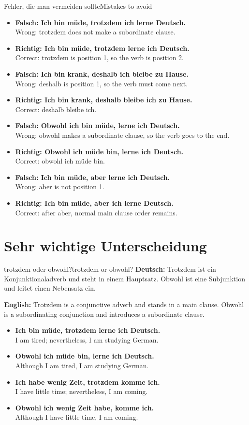 \documentclass[a4paper,11pt]{article}
\newcommand{\GermanText}[1]{\textbf{Deutsch: }#1\par}
\newcommand{\EnglishText}[1]{{\small\color{SoftGray}\textbf{English: }#1\par}}
\newcommand{\ExampleItem}[2]{\item \textbf{#1}\\{\small\color{SoftGray}#2}}
\begin{document}
        \begin{grammarentry}{Fehler, die man vermeiden sollte}{Mistakes to avoid}
            \begin{exbox}
                \begin{itemize}
                    \ExampleItem{Falsch: Ich bin müde, trotzdem ich lerne Deutsch.}{Wrong: trotzdem does not make a subordinate clause.}
                    \ExampleItem{Richtig: Ich bin müde, trotzdem lerne ich Deutsch.}{Correct: trotzdem is position 1, so the verb is position 2.}
                    
                    \ExampleItem{Falsch: Ich bin krank, deshalb ich bleibe zu Hause.}{Wrong: deshalb is position 1, so the verb must come next.}
                    \ExampleItem{Richtig: Ich bin krank, deshalb bleibe ich zu Hause.}{Correct: deshalb bleibe ich.}
                    
                    \ExampleItem{Falsch: Obwohl ich bin müde, lerne ich Deutsch.}{Wrong: obwohl makes a subordinate clause, so the verb goes to the end.}
                    \ExampleItem{Richtig: Obwohl ich müde bin, lerne ich Deutsch.}{Correct: obwohl ich müde bin.}
                    
                    \ExampleItem{Falsch: Ich bin müde, aber lerne ich Deutsch.}{Wrong: aber is not position 1.}
                    \ExampleItem{Richtig: Ich bin müde, aber ich lerne Deutsch.}{Correct: after aber, normal main clause order remains.}
                \end{itemize}
            \end{exbox}
        \end{grammarentry}
    
    
    \section{Sehr wichtige Unterscheidung}
        
        \begin{grammarentry}{trotzdem oder obwohl?}{trotzdem or obwohl?}
            \GermanText{Trotzdem ist ein Konjunktionaladverb und steht in einem Hauptsatz. Obwohl ist eine Subjunktion und leitet einen Nebensatz ein.}
            \EnglishText{Trotzdem is a conjunctive adverb and stands in a main clause. Obwohl is a subordinating conjunction and introduces a subordinate clause.}
            
            \begin{exbox}
                \begin{itemize}
                    \ExampleItem{Ich bin müde, trotzdem lerne ich Deutsch.}{I am tired; nevertheless, I am studying German.}
                    \ExampleItem{Obwohl ich müde bin, lerne ich Deutsch.}{Although I am tired, I am studying German.}
                    \ExampleItem{Ich habe wenig Zeit, trotzdem komme ich.}{I have little time; nevertheless, I am coming.}
                    \ExampleItem{Obwohl ich wenig Zeit habe, komme ich.}{Although I have little time, I am coming.}
                \end{itemize}
            \end{exbox}
        \end{grammarentry}
    
\end{document}
